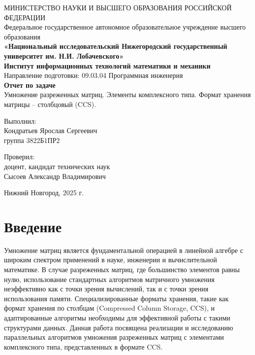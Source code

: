 \documentclass[12pt]{article}
\begin{document}
\begin{titlepage}
    \centering
МИНИСТЕРСТВО НАУКИ И ВЫСШЕГО ОБРАЗОВАНИЯ РОССИЙСКОЙ ФЕДЕРАЦИИ\\
Федеральное государственное автономное образовательное учреждение высшего образования\\
    {\bfseries\large «Национальный исследовательский Нижегородский государственный университет им.
Н.И. Лобачевского»}\\
    {\bfseries\large Институт информационных технологий математики и механики }\\
    Направление подготовки: 09.03.04 Программная инженерия\\

    \vspace{6cm}
    {\LARGE\bfseries Отчет по задаче}\\
    {\large Умножение разреженных матриц. Элементы комплексного типа. Формат хранения матрицы – столбцовый (CCS).}\\
    \vspace{6cm}

    {\hfill\parbox{0.5\textwidth}{%
        Выполнил:\\
        Кондратьев Ярослав Сергеевич\\
        группа 3822Б1ПР2\\

        \vspace{0.1cm}

        Проверил:\\
        доцент, кандидат технических наук\\
        Сысоев Александр Владимирович}
    }
    \vspace{2cm}

    Нижний Новгород, 2025 г.
\end{titlepage}

\tableofcontents
\newpage

\section{Введение}
Умножение матриц является фундаментальной операцией в линейной алгебре с широким спектром применений в науке, инженерии и вычислительной математике. В случае разреженных матриц, где большинство элементов равны нулю, использование стандартных алгоритмов матричного умножения неэффективно как с точки зрения вычислений, так и с точки зрения использования памяти. Специализированные форматы хранения, такие как формат хранения по столбцам (Compressed Column Storage, CCS), и адаптированные алгоритмы необходимы для эффективной работы с такими структурами данных. Данная работа посвящена реализации и исследованию параллельных алгоритмов умножения разреженных матриц с элементами комплексного типа, представленных в формате CCS.
\newpage
\end{document}

